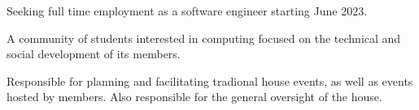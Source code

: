 \large{Seeking full time employment as a software engineer starting June 2023.}


         
\linebreak

A community of students interested in \break computing focused on the technical and social development of its members.
\break

Responsible for planning and facilitating tradional house events, as well as events hosted by members. Also responsible for the general oversight of the house.

\divider

\cvevent{}{}{}{}